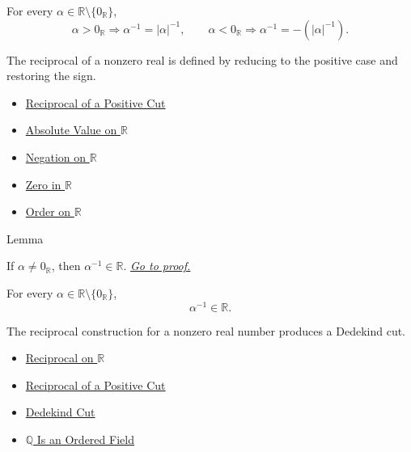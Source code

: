 \begin{remark*}
For every $\alpha\in\mathbb{R}\setminus\{0_{\mathbb{R}}\}$,
\[
\alpha>0_{\mathbb{R}}\Longrightarrow \alpha^{-1}=|\alpha|^{-1},
\qquad
\alpha<0_{\mathbb{R}}\Longrightarrow \alpha^{-1}=-(|\alpha|^{-1}).
\]
\end{remark*}

\begin{remark*}[Interpretation]
The reciprocal of a nonzero real is defined by reducing to the positive case
and restoring the sign.
\end{remark*}

\begin{dependencies}
\begin{itemize}
  \item \hyperref[def:reciprocal-positive-on-r]{Reciprocal of a Positive Cut}
  \item \hyperref[def:real-chapter-absolute-value-on-r]{Absolute Value on $\mathbb{R}$}
  \item \hyperref[def:negation-on-r]{Negation on $\mathbb{R}$}
  \item \hyperref[def:zero-in-r]{Zero in $\mathbb{R}$}
  \item \hyperref[def:order-on-r]{Order on $\mathbb{R}$}
\end{itemize}
\end{dependencies}

\begin{lemmabox}{Lemma}
\begin{lemma}
\label{lem:reciprocal-is-a-cut}
If $\alpha\ne0_{\mathbb{R}}$, then $\alpha^
{-1}\in\mathbb{R}$.
\hyperref[prf:reciprocal-is-a-cut]{\textit{Go to proof.}}
\end{lemma}
\end{lemmabox}

\begin{remark*}
For every $\alpha\in\mathbb{R}\setminus\{0_{\mathbb{R}}\}$,
\[
\alpha^{-1}\in\mathbb{R}.
\]
\end{remark*}

\begin{remark*}[Interpretation]
The reciprocal construction for a nonzero real number produces a Dedekind cut.
\end{remark*}

\begin{dependencies}
\begin{itemize}
  \item \hyperref[def:reciprocal-on-r]{Reciprocal on $\mathbb{R}$}
  \item \hyperref[def:reciprocal-positive-on-r]{Reciprocal of a Positive Cut}
  \item \hyperref[def:dedekind-cut]{Dedekind Cut}
  \item \hyperref[thm:q-is-an-ordered-field]{$\mathbb{Q}$ Is an Ordered Field}
\end{itemize}
\end{dependencies}

